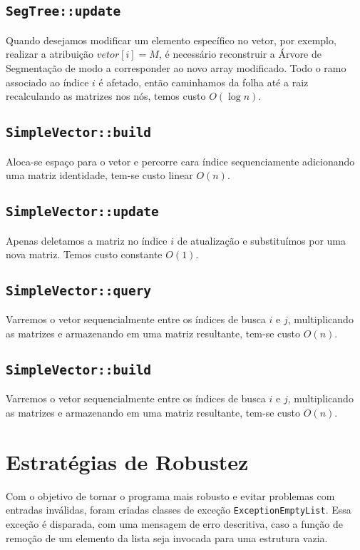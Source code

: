 \documentclass{article}
\begin{document}
\subsection{\texttt{SegTree::update}}

Quando desejamos modificar um elemento específico no vetor, por exemplo, realizar a atribuição \(vetor[i] = M\), é necessário reconstruir a Árvore de Segmentação de modo a corresponder ao novo array modificado. Todo o ramo associado ao índice $i$ é afetado, então caminhamos da folha até a raiz recalculando as matrizes nos nós, temos custo  \(O(\log n)\).

\subsection{\texttt{SimpleVector::build}}
Aloca-se espaço para o vetor e percorre cara índice sequenciamente adicionando uma matriz identidade, tem-se custo linear \(O(n)\).

\subsection{\texttt{SimpleVector::update}}
Apenas deletamos a matriz no índice $i$ de atualização e substituímos por uma nova matriz. Temos custo constante  \(O(1)\).

\subsection{\texttt{SimpleVector::query}}
Varremos o vetor sequencialmente entre os índices de busca $i$ e $j$, multiplicando as matrizes e armazenando em uma matriz resultante, tem-se custo  \(O(n)\).

\subsection{\texttt{SimpleVector::build}}
Varremos o vetor sequencialmente entre os índices de busca $i$ e $j$, multiplicando as matrizes e armazenando em uma matriz resultante, tem-se custo  \(O(n)\).

   



\section{Estratégias de Robustez}
Com o objetivo de tornar o programa mais robusto e evitar problemas com entradas inválidas, foram criadas classes de exceção \texttt{ExceptionEmptyList}. Essa exceção é disparada, com uma mensagem de erro descritiva, caso a função de remoção de um elemento da lista seja invocada para uma estrutura vazia. 
\end{document}
